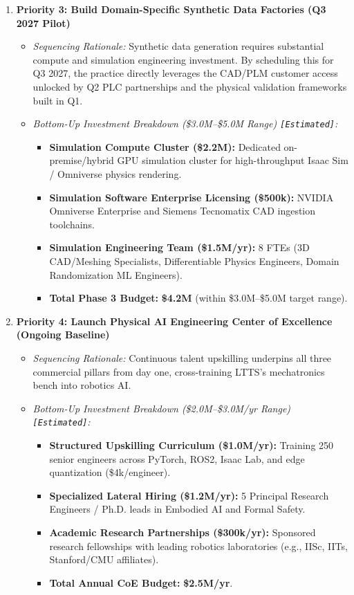 \documentclass[11pt,a4paper]{article}
\begin{document}
\begin{enumerate}
    \item \textbf{Priority 3: Build Domain-Specific Synthetic Data Factories (Q3 2027 Pilot)}
    \begin{itemize}
        \item \textit{Sequencing Rationale:} Synthetic data generation requires substantial compute and simulation engineering investment. By scheduling this for Q3 2027, the practice directly leverages the CAD/PLM customer access unlocked by Q2 PLC partnerships and the physical validation frameworks built in Q1.
        \item \textit{Bottom-Up Investment Breakdown (\$3.0M--\$5.0M Range) \texttt{[Estimated]}:}
        \begin{itemize}
            \item \textbf{Simulation Compute Cluster (\$2.2M):} Dedicated on-premise/hybrid GPU simulation cluster for high-throughput Isaac Sim / Omniverse physics rendering.
            \item \textbf{Simulation Software Enterprise Licensing (\$500k):} NVIDIA Omniverse Enterprise and Siemens Tecnomatix CAD ingestion toolchains.
            \item \textbf{Simulation Engineering Team (\$1.5M/yr):} 8 FTEs (3D CAD/Meshing Specialists, Differentiable Physics Engineers, Domain Randomization ML Engineers).
            \item \textbf{Total Phase 3 Budget:} \textbf{\$4.2M} (within \$3.0M--\$5.0M target range).
        \end{itemize}
    \end{itemize}

    \item \textbf{Priority 4: Launch Physical AI Engineering Center of Excellence (Ongoing Baseline)}
    \begin{itemize}
        \item \textit{Sequencing Rationale:} Continuous talent upskilling underpins all three commercial pillars from day one, cross-training LTTS's mechatronics bench into robotics AI.
        \item \textit{Bottom-Up Investment Breakdown (\$2.0M--\$3.0M/yr Range) \texttt{[Estimated]}:}
        \begin{itemize}
            \item \textbf{Structured Upskilling Curriculum (\$1.0M/yr):} Training 250 senior engineers across PyTorch, ROS2, Isaac Lab, and edge quantization (\$4k/engineer).
            \item \textbf{Specialized Lateral Hiring (\$1.2M/yr):} 5 Principal Research Engineers / Ph.D. leads in Embodied AI and Formal Safety.
            \item \textbf{Academic Research Partnerships (\$300k/yr):} Sponsored research fellowships with leading robotics laboratories (e.g., IISc, IITs, Stanford/CMU affiliates).
            \item \textbf{Total Annual CoE Budget:} \textbf{\$2.5M/yr}.
        \end{itemize}
    \end{itemize}
\end{enumerate}
\end{document}
